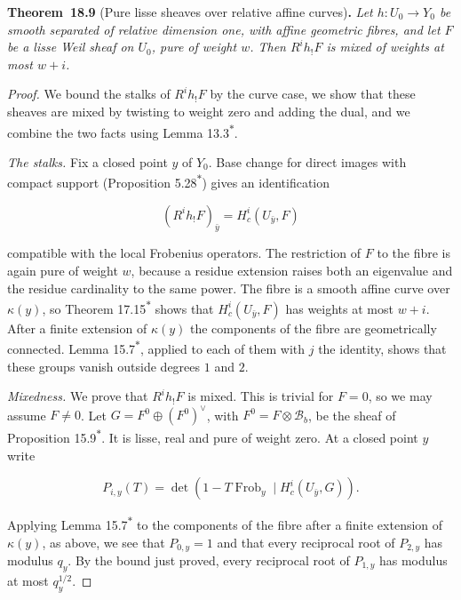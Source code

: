 \documentclass[11pt]{article}
\newenvironment{bpstatement}[2]{\par\addvspace{0.6\baselineskip}\noindent\textbf{#1}#2\textbf{.}\enspace\ignorespaces}
  {\par\addvspace{0.4\baselineskip}}
\newenvironment{bpstatementit}[2]{\begin{bpstatement}{#1}{#2}\itshape\ignorespaces}{\end{bpstatement}}
\newcommand{\bpout}[1]{#1\textsuperscript{\hyperlink{bp-outside}{\ensuremath{\ast}}}}
\begin{document}
\label{bp29}%
\begin{bpstatementit}{Theorem~18.9}{ (Pure lisse sheaves over relative affine curves)}
Let \(h:U_0\to Y_0\) be smooth separated of relative dimension one, with affine geometric fibres, and let \(F\) be a lisse Weil sheaf on \(U_0\), pure of weight \(w\). Then \(R^ih_!F\) is mixed of weights at most \(w+i\).
\end{bpstatementit}

\begin{proof}[{Proof}]\label{bp30}%
We bound the stalks of \(R^ih_!F\) by the curve case, we show that these sheaves are mixed by twisting to weight zero and adding the dual, and we combine the two facts using Lemma \bpout{13.3}.

\emph{The stalks.} Fix a closed point \(y\) of \(Y_0\). Base change for direct images with compact support (Proposition \bpout{5.28}) gives an identification

\[
(R^ih_!F)_{\bar y}=H_c^i(U_{\bar y},F)
\]

compatible with the local Frobenius operators. The restriction of \(F\) to the fibre is again pure of weight \(w\), because a residue extension raises both an eigenvalue and the residue cardinality to the same power. The fibre is a smooth affine curve over \(\kappa(y)\), so Theorem \bpout{17.15} shows that \(H_c^i(U_{\bar y},F)\) has weights at most \(w+i\). After a finite extension of \(\kappa(y)\) the components of the fibre are geometrically connected. Lemma \bpout{15.7}, applied to each of them with \(j\) the identity, shows that these groups vanish outside degrees \(1\) and \(2\).

\emph{Mixedness.} We prove that \(R^ih_!F\) is mixed. This is trivial for \(F=0\), so we may assume \(F\ne0\). Let \(G=F^0\oplus(F^0)^\vee\), with \(F^0=F\otimes\mathcal B_b\), be the sheaf of Proposition \bpout{15.9}. It is lisse, real and pure of weight zero. At a closed point \(y\) write

\[
P_{i,y}(T)=\det(1-T\operatorname{Frob}_y\mid H_c^i(U_{\bar y},G)).
\]

Applying Lemma \bpout{15.7} to the components of the fibre after a finite extension of \(\kappa(y)\), as above, we see that \(P_{0,y}=1\) and that every reciprocal root of \(P_{2,y}\) has modulus \(q_y\). By the bound just proved, every reciprocal root of \(P_{1,y}\) has modulus at most \(q_y^{1/2}\).


\end{proof}
\end{document}
